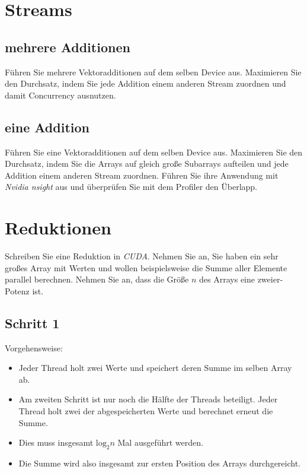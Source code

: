 \documentclass[headsepline=3pt,headinclude=true,12pt,oneside]{scrartcl}
\begin{document}
	\section{Streams}
	\subsection*{mehrere Additionen}
	Führen Sie mehrere Vektoradditionen auf dem selben Device aus. Maximieren Sie den Durchsatz, indem Sie jede Addition einem anderen Stream zuordnen und damit Concurrency ausnutzen.
	\subsection*{eine Addition}
	Führen Sie eine Vektoradditionen auf dem selben Device aus. Maximieren Sie den Durchsatz, indem Sie die Arrays auf gleich große Subarrays aufteilen und jede Addition einem anderen Stream zuordnen. Führen Sie ihre Anwendung mit \textit{Nvidia nsight} aus und überprüfen Sie mit dem Profiler den Überlapp.
	
	\section{Reduktionen}
	Schreiben Sie eine Reduktion in \textit{CUDA}. Nehmen Sie an, Sie haben ein sehr großes Array mit Werten und wollen beispielsweise die Summe aller Elemente parallel berechnen. Nehmen Sie an, dass die Größe $n$ des Arrays eine zweier-Potenz ist.
		
		\subsection{Schritt 1}
		Vorgehensweise:
		
		\begin{itemize}
			\item Jeder Thread holt zwei Werte und speichert deren Summe im selben Array ab.
			\item Am zweiten Schritt ist nur noch die Hälfte der Threads beteiligt. Jeder Thread holt zwei der abgespeicherten Werte und berechnet erneut die Summe.
			\item Dies muss insgesamt $\text{log}_2 n$ Mal ausgeführt werden.
			\item Die Summe wird also insgesamt zur ersten Position des Arrays durchgereicht.
		\end{itemize}
		
\end{document}
